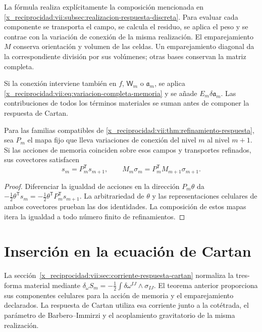 La fórmula realiza explícitamente la composición mencionada en
\ref{x_reciprocidad:vii:subsec:realizacion-respuesta-discreta}. Para evaluar cada
componente se transporta el campo, se calcula el residuo, se aplica el
peso y se contrae con la variación de conexión de la misma realización.
El emparejamiento \(M\) conserva orientación y volumen de las celdas.
Un emparejamiento diagonal da la correspondiente división por sus
volúmenes; otras bases conservan la matriz completa.

Si la conexión interviene también en \(f\), \(\mathsf W_m\)
o \(\mathfrak a_m\), se aplica
\eqref{x_reciprocidad:vii:eq:variacion-completa-memoria} y se añade
\(E_m\delta\mathfrak a_m\). Las contribuciones de todos los
términos materiales se suman antes de componer la respuesta de Cartan.

\begin{corollary}
\label{x_reciprocidad:vii:cor:refinamiento-corriente-conexion}
Para las familias compatibles de
\ref{x_reciprocidad:vii:thm:refinamiento-respuesta}, sea \(P_m\) el mapa fijo
que lleva variaciones de conexión del nivel \(m\) al nivel
\(m+1\). Si las acciones de memoria coinciden sobre esos campos
y transportes refinados, sus covectores satisfacen
\[
 s_m=P_m^{\mathsf T}s_{m+1},\qquad
 M_m\sigma_m=P_m^{\mathsf T}M_{m+1}\sigma_{m+1}.
\]
\end{corollary}

\begin{proof}
Diferenciar la igualdad de acciones en la dirección
\(P_m\theta\) da
\(-\tfrac12\theta^{\mathsf T}s_m
 =-\tfrac12\theta^{\mathsf T}P_m^{\mathsf T}s_{m+1}\).
La arbitrariedad de \(\theta\) y las representaciones celulares
de ambos covectores prueban las dos identidades. La composición de
estos mapas itera la igualdad a todo número finito de refinamientos.
\end{proof}

\section{Inserción en la ecuación de Cartan}

La sección~\ref{x_reciprocidad:vii:sec:corriente-respuesta-cartan} normaliza la
tres-forma material mediante
\(\delta_\omega S_m=-\tfrac12\int\delta\omega^{IJ}\wedge
\sigma_{IJ}\). El teorema anterior proporciona sus componentes
celulares para la acción de memoria y el emparejamiento declarados.
La respuesta de Cartan utiliza esa corriente junto a la cotétrada,
el parámetro de Barbero--Immirzi y el acoplamiento gravitatorio de la
misma realización.

